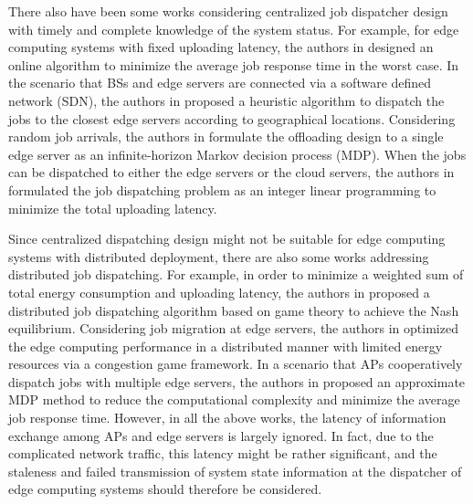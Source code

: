 There also have been some works considering centralized job dispatcher design with timely and complete knowledge of the system status.
For example, for edge computing systems with fixed uploading latency, the authors in \cite{tan-online} designed an online algorithm to minimize the average job response time in the worst case.
In the scenario that BSs and edge servers are connected via a software defined network (SDN), the authors in \cite{IOTJ18-FanQ} proposed a heuristic algorithm to dispatch the jobs to the closest edge servers according to geographical locations.
Considering random job arrivals, the authors in \cite{mdp-globecom,mdp-tvt} formulate the offloading design to a single edge server as an infinite-horizon Markov decision process (MDP).
When the jobs can be dispatched to either the edge servers or the cloud servers, the authors in \cite{MASS18-MengZ} formulated the job dispatching problem as an integer linear programming to minimize the total uploading latency.

Since centralized dispatching design might not be suitable for {edge computing systems} with distributed deployment, there are also some works addressing distributed job dispatching.
For example, in order to minimize a weighted sum of total energy consumption and uploading latency, the authors in \cite{ToN-Xuchen2016} proposed a distributed job dispatching algorithm based on game theory to achieve the Nash equilibrium. 
Considering job migration at edge servers, the authors in \cite{ToN-xujie2018} optimized the edge computing performance in a distributed manner with limited energy resources via a congestion game framework.
In a scenario that APs cooperatively dispatch jobs with multiple edge servers, the authors in \cite{mdp-jcin} proposed {an} approximate MDP method to reduce the computational complexity and minimize the average job response time.
However, in all the above works, the latency of information exchange among APs and edge servers is largely ignored.
In fact, due to the complicated network traffic, this latency might be rather significant, and the staleness {and failed transmission} of system state information at the dispatcher of edge computing systems should therefore be considered.

